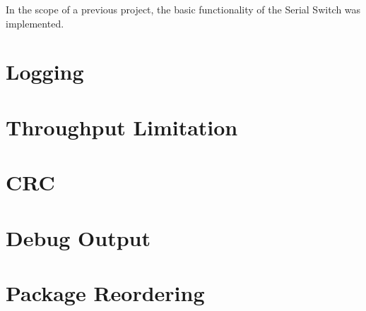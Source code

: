 %
In the scope of a previous project, the basic functionality of the Serial Switch was implemented.\\
\section{Logging}
\section{Throughput Limitation}
\section{CRC}
\section{Debug Output}
\section{Package Reordering}
